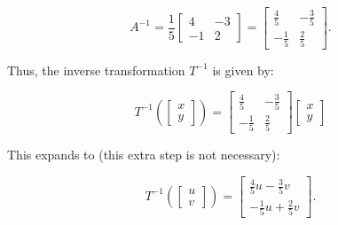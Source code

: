 \documentclass[a4paper,11pt,reqno]{amsart}
\numberwithin{equation}{section}
\begin{document}
\begin{enumerate}
\begin{center}
{{\[
A^{-1} = \frac{1}{5} \begin{bmatrix} 4 & -3 \\ -1 & 2 \end{bmatrix}
= \begin{bmatrix} \frac{4}{5} & -\frac{3}{5} \\ -\frac{1}{5} & \frac{2}{5} \end{bmatrix}.
\]

Thus, the inverse transformation \( T^{-1} \) is given by:

\[
T^{-1} \left(\begin{bmatrix} x \\ y \end{bmatrix} \right) =
\begin{bmatrix} \frac{4}{5} & -\frac{3}{5} \\ -\frac{1}{5} & \frac{2}{5} \end{bmatrix}
\begin{bmatrix} x \\ y \end{bmatrix}
\]

This expands to (this extra step is not necessary):

\[
T^{-1} \left(\begin{bmatrix} u \\ v \end{bmatrix} \right) =
\begin{bmatrix} \frac{4}{5}u - \frac{3}{5}v \\ -\frac{1}{5}u + \frac{2}{5}v \end{bmatrix}.
\]
}}
\end{center}

\end{enumerate}
\end{document}
